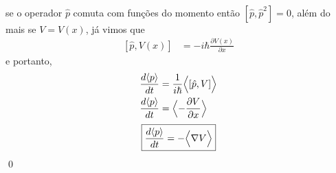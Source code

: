 \begin{prob}
\begin{sol}
\begin{enumerate}[label=\alph *)]
\begin{align}
				\end{align}
				se o operador $\hat{p}$ comuta com funções do momento então $\left[\hat{p},\hat{p}^{2}\right]=0$, além do mais se $V=V(x)$, já vimos que
				\begin{align}
					\left[\hat{p},V(x)\right] &= -i \hbar \frac{\partial V(x)}{\partial x}
				\end{align}
				e portanto,
				\begin{align}
					\frac{d \langle p \rangle}{dt} &= \frac{1}{i \hbar} \Bigl \langle [\hat{p}, V] \Bigr \rangle\nonumber\\
					\frac{d \langle p \rangle}{dt} &= \Bigl \langle -\frac{\partial V}{\partial x} \Bigr \rangle \nonumber\\
				\end{align}
				\begin{align}
					\boxed{
						\frac{d \langle p \rangle}{dt} = -\Bigl \langle \nabla V \Bigr \rangle
					}
				\end{align}\qed
		\end{enumerate}
	\end{sol}
\end{prob}

